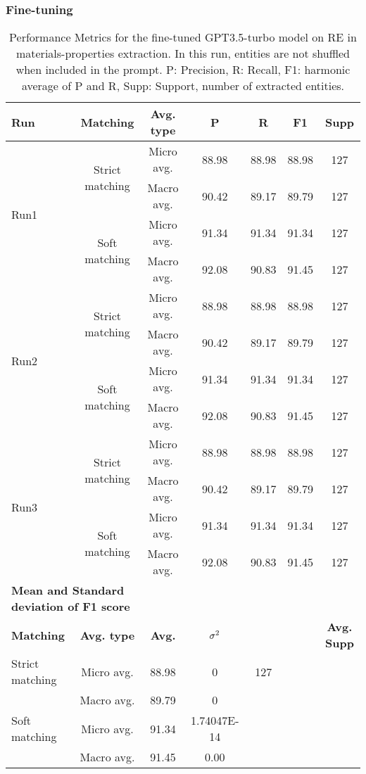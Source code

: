 \clearpage
\subsubsection{Fine-tuning}

\begin{table}[htbp]
    \small
    \centering
    \caption{Performance Metrics for the fine-tuned GPT3.5-turbo model on RE in materials-properties extraction. In this run, entities are not shuffled when included in the prompt. P: Precision, R: Recall, F1: harmonic average of P and R, Supp: Support, number of extracted entities.}
    \begin{tabular}{lcccccc}
        \toprule
        \textbf{Run} & \textbf{Matching} & \textbf{Avg. type} & \textbf{P} & \textbf{R} & \textbf{F1} & \textbf{Supp} \\
        \midrule
        \multirow{4}{*}{Run1} & \multirow{2}{*}{Strict matching} & Micro avg. & 88.98 & 88.98 & 88.98 & 127 \\
        & & Macro avg. & 90.42 & 89.17 & 89.79 & 127 \\
        \cmidrule{2-7}
        & \multirow{2}{*}{Soft matching} & Micro avg. & 91.34 & 91.34 & 91.34 & 127 \\
        & & Macro avg. & 92.08 & 90.83 & 91.45 & 127 \\
        \midrule
        \multirow{4}{*}{Run2} & \multirow{2}{*}{Strict matching} & Micro avg. & 88.98 & 88.98 & 88.98 & 127 \\
        & & Macro avg. & 90.42 & 89.17 & 89.79 & 127 \\
        \cmidrule{2-7}
        & \multirow{2}{*}{Soft matching} & Micro avg. & 91.34 & 91.34 & 91.34 & 127 \\
        & & Macro avg. & 92.08 & 90.83 & 91.45 & 127 \\
        \midrule
        \multirow{4}{*}{Run3} & \multirow{2}{*}{Strict matching} & Micro avg. & 88.98 & 88.98 & 88.98 & 127 \\
        & & Macro avg. & 90.42 & 89.17 & 89.79 & 127 \\
        \cmidrule{2-7}
        & \multirow{2}{*}{Soft matching} & Micro avg. & 91.34 & 91.34 & 91.34 & 127 \\
        & & Macro avg. & 92.08 & 90.83 & 91.45 & 127 \\
        \midrule
        \multicolumn{2}{l}{\textbf{Mean and Standard deviation of F1 score}} & & & & & \\
        \midrule
        \textbf{Matching} & \textbf{Avg. type} & \textbf{Avg.} & $\sigma\textsuperscript{2}$ & & & \textbf{Avg. Supp}\\
        Strict matching & Micro avg. & 88.98 & 0 & 127 \\
        & Macro avg. & 89.79 & 0 & \\
        Soft matching & Micro avg. & 91.34 & 1.74047E-14 & \\
        & Macro avg. & 91.45 & 0.00 & \\
        \bottomrule
    \end{tabular}
\end{table}


